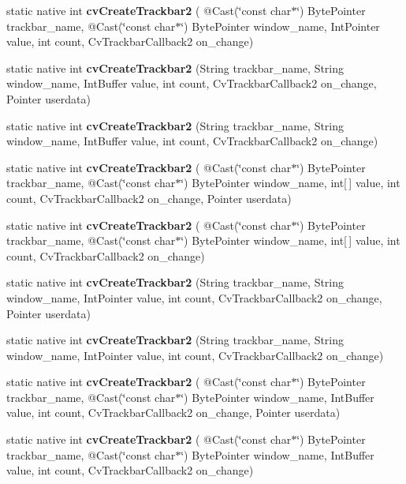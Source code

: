 \begin{DoxyCompactItemize}
static native int {\bfseries cv\+Create\+Trackbar2} ( @Cast(\char`\"{}const char$\ast$\char`\"{}) Byte\+Pointer trackbar\+\_\+name, @Cast(\char`\"{}const char$\ast$\char`\"{}) Byte\+Pointer window\+\_\+name, Int\+Pointer value, int count, Cv\+Trackbar\+Callback2 on\+\_\+change)
\item 
static native int {\bfseries cv\+Create\+Trackbar2} (String trackbar\+\_\+name, String window\+\_\+name, Int\+Buffer value, int count, Cv\+Trackbar\+Callback2 on\+\_\+change, Pointer userdata)
\item 
static native int {\bfseries cv\+Create\+Trackbar2} (String trackbar\+\_\+name, String window\+\_\+name, Int\+Buffer value, int count, Cv\+Trackbar\+Callback2 on\+\_\+change)
\item 
static native int {\bfseries cv\+Create\+Trackbar2} ( @Cast(\char`\"{}const char$\ast$\char`\"{}) Byte\+Pointer trackbar\+\_\+name, @Cast(\char`\"{}const char$\ast$\char`\"{}) Byte\+Pointer window\+\_\+name, int\mbox{[}$\,$\mbox{]} value, int count, Cv\+Trackbar\+Callback2 on\+\_\+change, Pointer userdata)
\item 
static native int {\bfseries cv\+Create\+Trackbar2} ( @Cast(\char`\"{}const char$\ast$\char`\"{}) Byte\+Pointer trackbar\+\_\+name, @Cast(\char`\"{}const char$\ast$\char`\"{}) Byte\+Pointer window\+\_\+name, int\mbox{[}$\,$\mbox{]} value, int count, Cv\+Trackbar\+Callback2 on\+\_\+change)
\item 
static native int {\bfseries cv\+Create\+Trackbar2} (String trackbar\+\_\+name, String window\+\_\+name, Int\+Pointer value, int count, Cv\+Trackbar\+Callback2 on\+\_\+change, Pointer userdata)
\item 
static native int {\bfseries cv\+Create\+Trackbar2} (String trackbar\+\_\+name, String window\+\_\+name, Int\+Pointer value, int count, Cv\+Trackbar\+Callback2 on\+\_\+change)
\item 
static native int {\bfseries cv\+Create\+Trackbar2} ( @Cast(\char`\"{}const char$\ast$\char`\"{}) Byte\+Pointer trackbar\+\_\+name, @Cast(\char`\"{}const char$\ast$\char`\"{}) Byte\+Pointer window\+\_\+name, Int\+Buffer value, int count, Cv\+Trackbar\+Callback2 on\+\_\+change, Pointer userdata)
\item 
static native int {\bfseries cv\+Create\+Trackbar2} ( @Cast(\char`\"{}const char$\ast$\char`\"{}) Byte\+Pointer trackbar\+\_\+name, @Cast(\char`\"{}const char$\ast$\char`\"{}) Byte\+Pointer window\+\_\+name, Int\+Buffer value, int count, Cv\+Trackbar\+Callback2 on\+\_\+change)
\item 

\end{DoxyCompactItemize}
